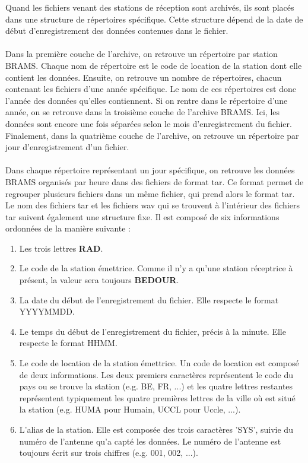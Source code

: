 \documentclass[11pt]{article}
\begin{document}
Quand les fichiers venant des stations de réception sont archivés, ils sont placés dans une structure de répertoires spécifique.
Cette structure dépend de la date de début d'enregistrement des données contenues dans le fichier.\\
\\
Dans la première couche de l'archive, on retrouve un répertoire par station BRAMS.
Chaque nom de répertoire est le code de location de la station dont elle contient les données.
Ensuite, on retrouve un nombre de répertoires, chacun contenant les fichiers d'une année spécifique.
Le nom de ces répertoires est donc l'année des données qu'elles contiennent.
Si on rentre dans le répertoire d'une année, on se retrouve dans la troisième couche de l'archive BRAMS.
Ici, les données sont encore une fois séparées selon le mois d'enregistrement du fichier.
Finalement, dans la quatrième couche de l'archive, on retrouve un répertoire par jour d'enregistrement d'un fichier.\\
\\
Dans chaque répertoire représentant un jour spécifique, on retrouve les données BRAMS organisés par heure dans des fichiers de format tar.
Ce format permet de regrouper plusieurs fichiers dans un même fichier, qui prend alors le format tar.
Le nom des fichiers tar et les fichiers wav qui se trouvent à l'intérieur des fichiers tar suivent également une structure fixe.
Il est composé de six informations ordonnées de la manière suivante :
\begin{enumerate}
    \item Les trois lettres \textbf{RAD}.
    \item Le code de la station émettrice.
          Comme il n'y a qu'une station réceptrice à présent, la valeur sera toujours \textbf{BEDOUR}.
    \item La date du début de l'enregistrement du fichier.
          Elle respecte le format YYYYMMDD.
    \item Le temps du début de l'enregistrement du fichier, précis à la minute.
          Elle respecte le format HHMM.
    \item Le code de location de la station émettrice.
          Un code de location est composé de deux informations.
          Les deux premiers caractères représentent le code du pays ou se trouve la station (e.g. BE, FR, ...) et les quatre lettres restantes représentent typiquement les quatre premières lettres de la ville où est situé la station (e.g. HUMA pour Humain, UCCL pour Uccle, ...).
    \item L'alias de la station.
          Elle est composée des trois caractères 'SYS', suivie du numéro de l'antenne qu'a capté les données.
          Le numéro de l'antenne est toujours écrit sur trois chiffres (e.g. 001, 002, ...).
\end{enumerate}
\end{document}
